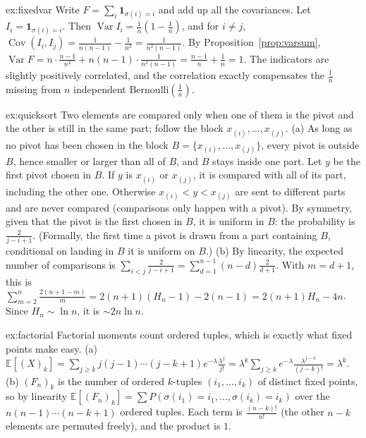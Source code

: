 \begin{solution}{ex:fixedvar}
\idea Write $F=\sum_i\mathbf 1_{\sigma(i)=i}$ and add up all the covariances.
\writeup Let $I_i=\mathbf 1_{\sigma(i)=i}$. Then $\operatorname{Var}I_i=\frac1n(1-\frac1n)$, and for $i\ne j$, $\operatorname{Cov}(I_i,I_j)=\frac1{n(n-1)}-\frac1{n^2}=\frac1{n^2(n-1)}$.
By Proposition~\ref{prop:varsum}, $\operatorname{Var}F=n\cdot\frac{n-1}{n^2}+n(n-1)\cdot\frac1{n^2(n-1)}=\frac{n-1}n+\frac1n=1$. The indicators are slightly
positively correlated, and the correlation exactly compensates the $\frac1n$ missing from $n$ independent Bernoulli$(\frac1n)$.
\end{solution}

\begin{solution}{ex:quicksort}
\idea Two elements are compared only when one of them is the pivot and the other is still in the same part; follow
the block $x_{(i)},\dots,x_{(j)}$.
\writeup (a) As long as no pivot has been chosen in the block $B=\{x_{(i)},\dots,x_{(j)}\}$, every pivot is outside $B$, hence
smaller or larger than all of $B$, and $B$ stays inside one part. Let $y$ be the first pivot chosen in $B$. If $y$ is
$x_{(i)}$ or $x_{(j)}$, it is compared with all of its part, including the other one. Otherwise $x_{(i)}<y<x_{(j)}$ are sent to
different parts and are never compared (comparisons only happen with a pivot). By symmetry, given that the pivot
is the first chosen in $B$, it is uniform in $B$: the probability is $\frac2{j-i+1}$. (Formally, the first time a pivot is
drawn from a part containing $B$, conditional on landing in $B$ it is uniform on $B$.)
(b) By linearity, the expected number of comparisons is $\sum_{i<j}\frac2{j-i+1}=\sum_{d=1}^{n-1}(n-d)\frac2{d+1}$. With $m=d+1$,
this is $\sum_{m=2}^n\frac{2(n+1-m)}m=2(n+1)(H_n-1)-2(n-1)=2(n+1)H_n-4n$. Since $H_n\sim\ln n$, it is $\sim2n\ln n$.
\end{solution}

\begin{solution}{ex:factorial}
\idea Factorial moments count ordered tuples, which is exactly what fixed points make easy.
\writeup (a) $\mathbb E[(X)_k]=\sum_{j\ge k}j(j-1)\cdots(j-k+1)e^{-\lambda}\frac{\lambda^j}{j!}=\lambda^k\sum_{j\ge k}e^{-\lambda}\frac{\lambda^{j-k}}{(j-k)!}=\lambda^k$.
(b) $(F_n)_k$ is the number of ordered $k$-tuples $(i_1,\dots,i_k)$ of distinct fixed points, so by linearity
$\mathbb E[(F_n)_k]=\sum P(\sigma(i_1)=i_1,\dots,\sigma(i_k)=i_k)$ over the $n(n-1)\cdots(n-k+1)$ ordered tuples. Each term is
$\frac{(n-k)!}{n!}$ (the other $n-k$ elements are permuted freely), and the product is $1$.
\end{solution}

